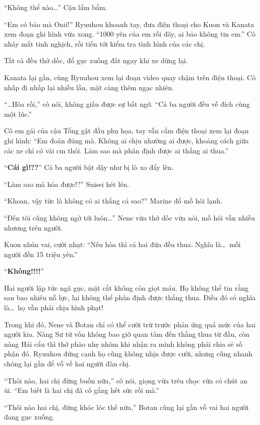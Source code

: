 \documentclass[../main.tex]{subfiles}
\begin{document}
``Không thể nào\dots'' Cậu lẩm bẩm.

``Em có bảo mà Onii!'' Ryuuhou khoanh tay, đưa điện thoại cho Kuon và Kanata xem đoạn ghi hình vừa xong. ``1000 yên của em rồi đây, ai bảo không tin em.'' Cô nháy mắt tinh nghịch, rồi tiến tới kiểm tra tình hình của các chị.

Tất cả đều thở dốc, đổ gục xuống đất ngay khi xe dừng lại.

Kanata lại gần, cùng Ryuuhou xem lại đoạn video quay chậm trên điện thoại. Cô nhấp đi nhấp lại nhiều lần, mặt càng thêm ngạc nhiên.

``\dots Hòa rồi,'' cô nói, không giấu được sự bất ngờ. ``Cả ba người đều về đích cùng một lúc.''

Cô em gái của cậu Tổng gật đầu phụ họa, tay vẫn cầm điện thoại xem lại đoạn ghi hình: ``Em đoán đúng mà. Không ai chịu nhường ai được, khoảng cách giữa các xe chỉ có vài cm thôi. Làm sao mà phân định được ai thắng ai thua.''

``\textbf{Cái gì!??}'' Cả ba người bật dậy như bị lò xo đẩy lên.

``Làm sao mà hòa được!?'' Suisei hét lên.

``Khoan, vậy tức là không có ai thắng cả sao?'' Marine đổ mồ hôi lạnh.

``Đến tôi cũng không ngờ tới luôn\dots'' Nene vừa thở dốc vừa nói, mồ hôi vẫn nhiễu nhương trên người.

Kuon nhún vai, cười nhạt: ``Nếu hòa thì cả hai đứa đều thua. Nghĩa là\dots\ mỗi người đền 15 triệu yên.''

``\textbf{Không!!!!}''

Hai người lập tức ngã gục, mặt cắt không còn giọt máu. Họ không thể tin rằng sau bao nhiêu nỗ lực, lại không thể phân định được thắng thua. Điều đó có nghĩa là\dots\ họ vẫn phải chịu hình phạt!

Trong khi đó, Nene và Botan chỉ có thể cười trừ trước phản ứng quá mức của hai người kia. Nàng Sư tử vốn không bao giờ quan tâm đến thắng thua từ đầu, còn nàng Hải cẩu thì thở phào nhẹ nhõm khi nhận ra mình không phải chia sẻ số phận đó. Ryuuhou đứng cạnh họ cũng không nhịn được cười, nhưng cũng nhanh chóng lại gần để vỗ về hai người đàn chị.

``Thôi nào, hai chị đừng buồn nữa,'' cô nói, giọng vừa trêu chọc vừa có chút an ủi. ``Em biết là hai chị đã cố gắng hết sức rồi mà.''

``Thôi nào hai chị, đừng khóc lóc thế nữa,'' Botan cũng lại gần vỗ vai hai người đang gục xuống.
\end{document}
